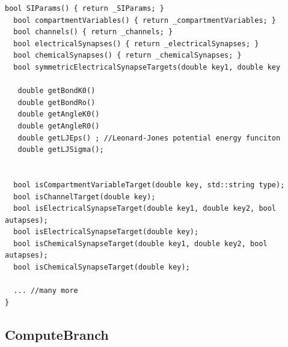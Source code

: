\begin{lstlisting}[basicstyle=\tiny, %or \small or \footnotesize etc.
]
  bool SIParams() { return _SIParams; }
  bool compartmentVariables() { return _compartmentVariables; }
  bool channels() { return _channels; }
  bool electricalSynapses() { return _electricalSynapses; }
  bool chemicalSynapses() { return _chemicalSynapses; }
  bool symmetricElectricalSynapseTargets(double key1, double key

   double getBondK0()
   double getBondRo()
   double getAngleK0()
   double getAngleR0()
   double getLJEps() ; //Leonard-Jones potential energy funciton
   double getLJSigma();
   

  bool isCompartmentVariableTarget(double key, std::string type);
  bool isChannelTarget(double key);
  bool isElectricalSynapseTarget(double key1, double key2, bool autapses);
  bool isElectricalSynapseTarget(double key);
  bool isChemicalSynapseTarget(double key1, double key2, bool autapses);
  bool isChemicalSynapseTarget(double key);   

  ... //many more
}
\end{lstlisting}

% 


%    
\subsection{ComputeBranch}
\label{sec:ComputeBranch}

